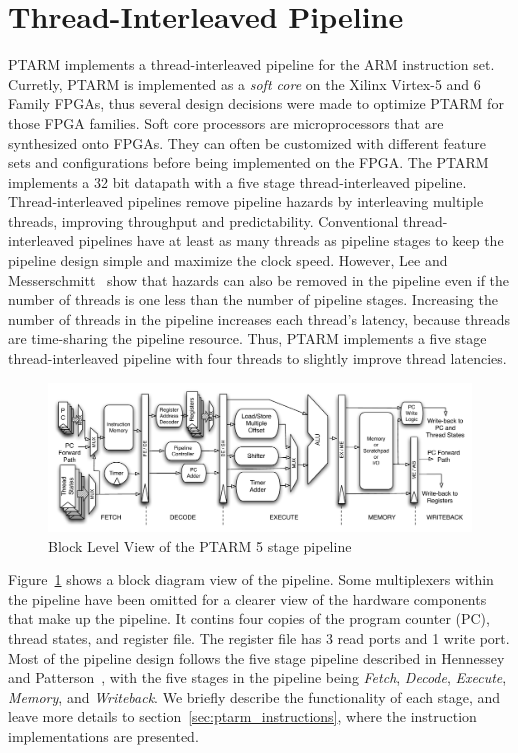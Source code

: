 \section{Thread-Interleaved Pipeline}
PTARM implements a thread-interleaved pipeline for the ARM instruction set.
Curretly, PTARM is implemented as a \emph{soft core} on the Xilinx Virtex-5 and 6 Family FPGAs, thus several design decisions were made to optimize PTARM for those FPGA families.
Soft core processors are microprocessors that are synthesized onto FPGAs.
They can often be customized with different feature sets and configurations before being implemented on the FPGA.  
The PTARM implements a 32 bit datapath with a five stage thread-interleaved pipeline.
Thread-interleaved pipelines remove pipeline hazards by interleaving multiple threads, improving throughput and predictability. 
Conventional thread-interleaved pipelines have at least as many threads as pipeline stages to keep the pipeline design simple and maximize the clock speed.
However, Lee and Messerschmitt~\cite{lee1987pip} show that hazards can also be removed in the pipeline even if the number of threads is one less than the number of pipeline stages.  
Increasing the number of threads in the pipeline increases each thread's latency, because threads are time-sharing the pipeline resource. 
Thus, PTARM implements a five stage thread-interleaved pipeline with four threads to slightly improve thread latencies.

\begin{figure}[b]
  \vspace{-20pt}
  \begin{center}
    \includegraphics[scale=.54]{figs/ptarm_pipeline_five_stage}
  \end{center}
  \vspace{-20pt}
  \caption{Block Level View of the PTARM 5 stage pipeline}
  \label{fig:ptarm_pipeline_five_stage}
\end{figure}

Figure~\ref{fig:ptarm_pipeline_five_stage} shows a block diagram view of the pipeline. 
Some multiplexers within the pipeline have been omitted for a clearer view of the hardware components that make up the pipeline.
It contins four copies of the program counter (PC), thread states, and register file.
The register file has 3 read ports and 1 write port.
Most of the pipeline design follows the five stage pipeline described in Hennessey and Patterson~\cite{Hennessey2007CompArch}, with the five stages in the pipeline being \emph{Fetch}, \emph{Decode}, \emph{Execute}, \emph{Memory}, and \emph{Writeback}.
We briefly describe the functionality of each stage, and leave more details to section~\ref{sec:ptarm_instructions}, where the instruction implementations are presented.

